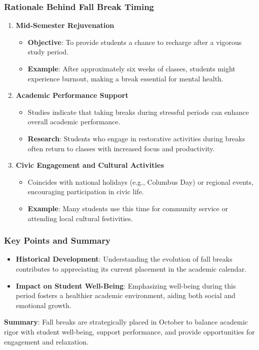\documentclass[aspectratio=169]{beamer}
\begin{document}
\begin{frame}[fragile]
    \frametitle{Rationale Behind Fall Break Timing}
    \begin{enumerate}
        \item \textbf{Mid-Semester Rejuvenation}
            \begin{itemize}
                \item \textbf{Objective}: To provide students a chance to recharge after a vigorous study period.
                \item \textbf{Example}: After approximately six weeks of classes, students might experience burnout, making a break essential for mental health.
            \end{itemize}
        \item \textbf{Academic Performance Support}
            \begin{itemize}
                \item Studies indicate that taking breaks during stressful periods can enhance overall academic performance.
                \item \textbf{Research}: Students who engage in restorative activities during breaks often return to classes with increased focus and productivity.
            \end{itemize}
        \item \textbf{Civic Engagement and Cultural Activities}
            \begin{itemize}
                \item Coincides with national holidays (e.g., Columbus Day) or regional events, encouraging participation in civic life.
                \item \textbf{Example}: Many students use this time for community service or attending local cultural festivities.
            \end{itemize}
    \end{enumerate}
\end{frame}

\begin{frame}[fragile]
    \frametitle{Key Points and Summary}
    \begin{itemize}
        \item \textbf{Historical Development}: Understanding the evolution of fall breaks contributes to appreciating its current placement in the academic calendar.
        \item \textbf{Impact on Student Well-Being}: Emphasizing well-being during this period fosters a healthier academic environment, aiding both social and emotional growth.
    \end{itemize}
    
    \textbf{Summary}: Fall breaks are strategically placed in October to balance academic rigor with student well-being, support performance, and provide opportunities for engagement and relaxation.
\end{frame}
\end{document}
